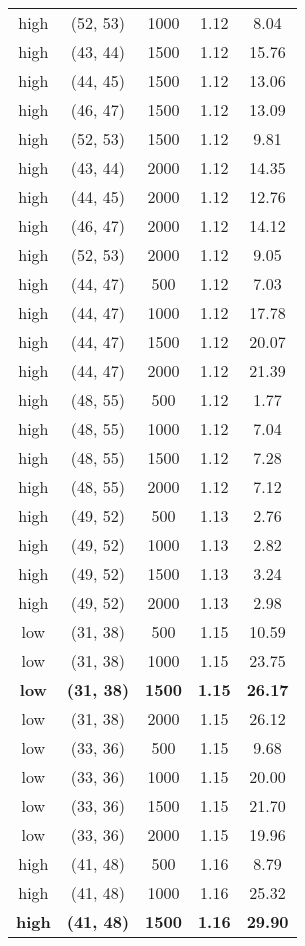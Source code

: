 \begin{tabular}{c c c c c}
high & (52, 53) &  1000 & 1.12 & 8.04 \\
high & (43, 44) &  1500 & 1.12 & 15.76 \\
high & (44, 45) &  1500 & 1.12 & 13.06 \\
high & (46, 47) &  1500 & 1.12 & 13.09 \\
high & (52, 53) &  1500 & 1.12 & 9.81 \\
high & (43, 44) &  2000 & 1.12 & 14.35 \\
high & (44, 45) &  2000 & 1.12 & 12.76 \\
high & (46, 47) &  2000 & 1.12 & 14.12 \\
high & (52, 53) &  2000 & 1.12 & 9.05 \\
high & (44, 47) &  500 & 1.12 & 7.03 \\
high & (44, 47) &  1000 & 1.12 & 17.78 \\
high & (44, 47) &  1500 & 1.12 & 20.07 \\
high & (44, 47) &  2000 & 1.12 & 21.39 \\
high & (48, 55) &  500 & 1.12 & 1.77 \\
high & (48, 55) &  1000 & 1.12 & 7.04 \\
high & (48, 55) &  1500 & 1.12 & 7.28 \\
high & (48, 55) &  2000 & 1.12 & 7.12 \\
high & (49, 52) &  500 & 1.13 & 2.76 \\
high & (49, 52) &  1000 & 1.13 & 2.82 \\
high & (49, 52) &  1500 & 1.13 & 3.24 \\
high & (49, 52) &  2000 & 1.13 & 2.98 \\
low & (31, 38) &  500 & 1.15 & 10.59 \\
low & (31, 38) &  1000 & 1.15 & 23.75 \\
\textbf{low} & \textbf{(31, 38)} & \textbf{ 1500} & \textbf{1.15} & \textbf{26.17} \\
low & (31, 38) &  2000 & 1.15 & 26.12 \\
low & (33, 36) &  500 & 1.15 & 9.68 \\
low & (33, 36) &  1000 & 1.15 & 20.00 \\
low & (33, 36) &  1500 & 1.15 & 21.70 \\
low & (33, 36) &  2000 & 1.15 & 19.96 \\
high & (41, 48) &  500 & 1.16 & 8.79 \\
high & (41, 48) &  1000 & 1.16 & 25.32 \\
\textbf{high} & \textbf{(41, 48)} & \textbf{ 1500} & \textbf{1.16} & \textbf{29.90} \\

\end{tabular}
